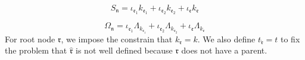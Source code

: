 \begin{lem}
\begin{equation}\label{eq.defnS_noperator.threewave}
    S_{\mathfrak{n}}=\iota_{\mathfrak{e}_1}k_{\mathfrak{e}_1}+\iota_{\mathfrak{e}_2}k_{\mathfrak{e}_2}+\iota_{\mathfrak{e}}k_{\mathfrak{e}}
\end{equation}

\begin{equation}
    \Omega_{\mathfrak{n}}=\iota_{\mathfrak{e}_1}\Lambda_{k_{\mathfrak{e}_1}}+\iota_{\mathfrak{e}_2}\Lambda_{k_{\mathfrak{e}_2}}+\iota_{\mathfrak{e}}\Lambda_{k_{\mathfrak{e}}}
\end{equation}
For root node $\mathfrak{r}$, we impose the constrain that $k_{\mathfrak{r}}=k$. We also define $t_{\widehat{\mathfrak{r}}}=t$ to fix the problem that $\widehat{\mathfrak{r}}$ is not well defined because $\mathfrak{r}$ does not have a parent. 


\end{lem}
